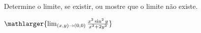Determine o limite, se existir, ou mostre que o limite não existe.

\item$\mathlarger{\lim_{(x,y)\rightarrow(0,0)} \frac{x^2\sin^2y}{x^2+2y^2}}$
